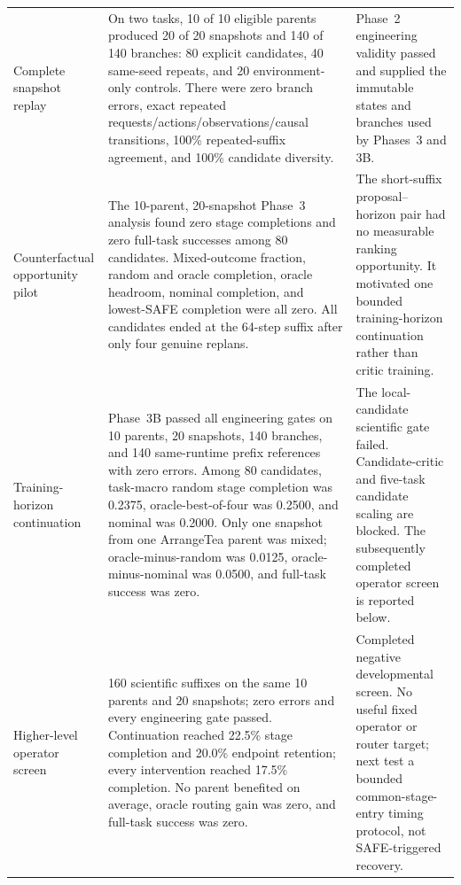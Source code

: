 \begin{longtable}{P{0.22\textwidth}P{0.36\textwidth}P{0.32\textwidth}}
Complete snapshot replay & On two tasks, 10 of 10 eligible parents produced 20 of 20 snapshots and 140 of 140 branches: 80 explicit candidates, 40 same-seed repeats, and 20 environment-only controls. There were zero branch errors, exact repeated requests/actions/observations/causal transitions, 100\% repeated-suffix agreement, and 100\% candidate diversity. & Phase~2 engineering validity passed and supplied the immutable states and branches used by Phases~3 and 3B. \\
Counterfactual opportunity pilot & The 10-parent, 20-snapshot Phase~3 analysis found zero stage completions and zero full-task successes among 80 candidates. Mixed-outcome fraction, random and oracle completion, oracle headroom, nominal completion, and lowest-SAFE completion were all zero. All candidates ended at the 64-step suffix after only four genuine replans. & The short-suffix proposal--horizon pair had no measurable ranking opportunity. It motivated one bounded training-horizon continuation rather than critic training. \\
Training-horizon continuation & Phase~3B passed all engineering gates on 10 parents, 20 snapshots, 140 branches, and 140 same-runtime prefix references with zero errors. Among 80 candidates, task-macro random stage completion was 0.2375, oracle-best-of-four was 0.2500, and nominal was 0.2000. Only one snapshot from one ArrangeTea parent was mixed; oracle-minus-random was 0.0125, oracle-minus-nominal was 0.0500, and full-task success was zero. & The local-candidate scientific gate failed. Candidate-critic and five-task candidate scaling are blocked. The subsequently completed operator screen is reported below. \\
Higher-level operator screen & 160 scientific suffixes on the same 10 parents and 20 snapshots; zero errors and every engineering gate passed. Continuation reached 22.5\% stage completion and 20.0\% endpoint retention; every intervention reached 17.5\% completion. No parent benefited on average, oracle routing gain was zero, and full-task success was zero. & Completed negative developmental screen. No useful fixed operator or router target; next test a bounded common-stage-entry timing protocol, not SAFE-triggered recovery. \\
\bottomrule
\end{longtable}
\endgroup

